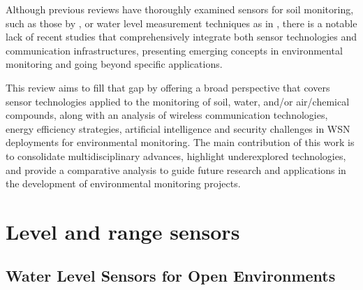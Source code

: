 \documentclass[conference]{IEEEtran}
\begin{document}
Although previous reviews have thoroughly examined sensors for soil monitoring, such as those by \cite{yin_2021_smart, teng_2014_soil, queiroz_2020_sensors}, or water level measurement techniques as in \cite{mohindru_2023_development, nr_2025_ai, wu_2023_a}, there is a notable lack of recent studies that comprehensively integrate both sensor technologies and communication infrastructures, presenting emerging concepts in environmental monitoring and going beyond specific applications.

This review aims to fill that gap by offering a broad perspective that covers sensor technologies applied to the monitoring of soil, water, and/or air/chemical compounds, along with an analysis of wireless communication technologies, energy efficiency strategies, artificial intelligence and security challenges in WSN deployments for environmental monitoring. The main contribution of this work is to consolidate multidisciplinary advances, highlight underexplored technologies, and provide a comparative analysis to guide future research and applications in the development of environmental monitoring projects.

\section{Level and range sensors} \label{cap:sensors}



\subsection{Water Level Sensors for Open Environments} \label{subsec:water_level_sensors}
\end{document}
